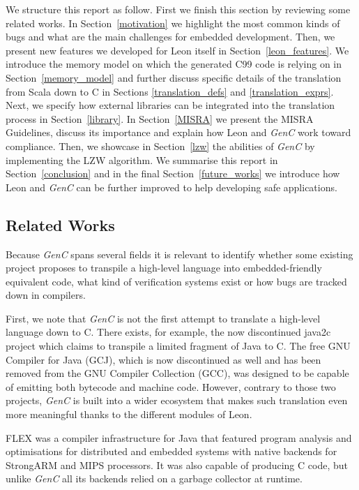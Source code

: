 \documentclass[a4paper,twoside]{article}
\newcommand{\GenC}{\emph{GenC}\xspace}
\newcommand{\RefSec}[1]{Section~\ref{#1}}
\begin{document}
We structure this report as follow. First we finish this section by reviewing
some related works. In \RefSec{motivation} we highlight the most common kinds of
bugs and what are the main challenges for embedded development. Then, we present
new features we developed for Leon itself in \RefSec{leon_features}. We
introduce the memory model on which the generated C99 code is relying on in
\RefSec{memory_model} and further discuss specific details of the translation
from Scala down to C in Sections \ref{translation_defs} and
\ref{translation_exprs}. Next, we specify how external libraries can be
integrated into the translation process in \RefSec{library}. In \RefSec{MISRA}
we present the MISRA Guidelines, discuss its importance and explain how Leon and
\GenC work toward compliance. Then, we showcase in \RefSec{lzw} the abilities of
\GenC by implementing the LZW algorithm. We summarise this report in
\RefSec{conclusion} and in the final \RefSec{future_works} we introduce how Leon
and \GenC can be further improved to help developing safe applications.

\subsection*{Related Works}

Because \GenC spans several fields it is relevant to identify whether some
existing project proposes to transpile a high-level language into
embedded-friendly equivalent code, what kind of verification systems exist or
how bugs are tracked down in compilers.

First, we note that \GenC is not the first attempt to translate a high-level
language down to C. There exists, for example, the now discontinued java2c
\cite{java2c} project which claims to transpile a limited fragment of Java to C.
The free GNU Compiler for Java (GCJ), which is now discontinued as well and has
been removed from the GNU Compiler Collection (GCC), was designed to be capable
of emitting both bytecode and machine code. However, contrary to those two
projects, \GenC is built into a wider ecosystem that makes such translation even
more meaningful thanks to the different modules of Leon.

FLEX \cite{flex} was a compiler infrastructure for Java that featured program
analysis and optimisations for distributed and embedded systems with native
backends for StrongARM and MIPS processors. It was also capable of producing C
code, but unlike \GenC all its backends relied on a garbage collector at
runtime.
\end{document}
